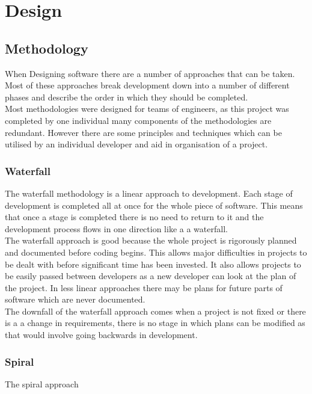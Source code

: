 \documentclass{article}
\begin{document}
\section{Design}

\subsection{Methodology}
When Designing software there are a number of approaches that can be taken. Most of these approaches break development down into a number of different phases and describe the order in which they should be completed.\\

Most methodologies were designed for teams of engineers, as this project was completed by one individual many components of the methodologies are redundant. However there are some principles and techniques which can be utilised by an individual developer and aid in organisation of a project.

\subsubsection{Waterfall}
The waterfall methodology is a linear approach to development. Each stage of development is completed all at once for the whole piece of software. This means that once a stage is completed there is no need to return to it and the development process flows in one direction like a a waterfall.\\

The waterfall approach is good because the whole project is rigorously planned and documented before coding begins. This allows major difficulties in projects to be dealt with before significant time has been invested. It also allows projects to be easily passed between developers as a new developer can look at the plan of the project. In less linear approaches there may be plans for future parts of software which are never documented.\\

The downfall of the waterfall approach comes when a project is not fixed or there is a a change in requirements, there is no stage in which plans can be modified as that would involve going backwards in development.\\

\subsubsection{Spiral}
The spiral approach
\end{document}

